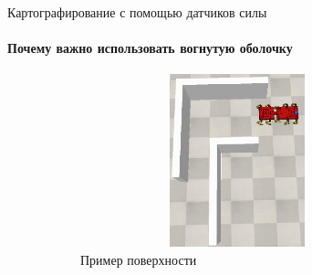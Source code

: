 \documentclass[aspectratio=169,xcolor=table]{beamer}
\begin{document}
\begin{frame}[t]{Картографирование с помощью датчиков силы}
    \framesubtitle{Почему важно использовать вогнутую оболочку}
    \vspace{-15pt}
    \begin{figure}[H]
        \begin{subfigure}[t]{0.3\textwidth}
            \centering\includegraphics[height=5cm,width=1\textwidth,keepaspectratio]{convex_terr.png}
            \caption*{Пример поверхности}
            \label{fig:convex_terr.png}
        \end{subfigure}
        \hfill
        \begin{subfigure}[t]{0.33\textwidth}
                \centering
\end{subfigure}
\end{figure}
\end{frame}
\end{document}
